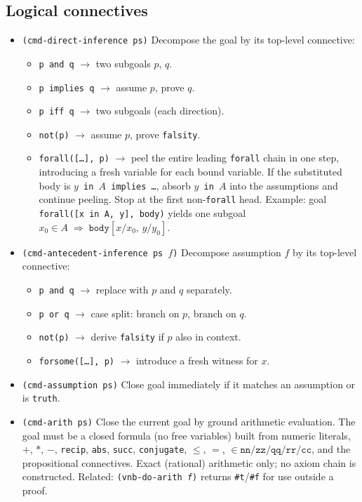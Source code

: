 \subsection{Logical connectives}

\begin{itemize}

\item \texttt{(cmd-direct-inference ps)}
  Decompose the goal by its top-level connective:
  \begin{itemize}
  \item \texttt{p and q} $\to$ two subgoals $p$, $q$.
  \item \texttt{p implies q} $\to$ assume $p$, prove $q$.
  \item \texttt{p iff q} $\to$ two subgoals (each direction).
  \item \texttt{not(p)} $\to$ assume $p$, prove \texttt{falsity}.
  \item \texttt{forall([\ldots], p)} $\to$ peel the entire leading
    \texttt{forall} chain in one step, introducing a fresh variable for
    each bound variable.  If the substituted body is
    \texttt{$y$ in $A$ implies \ldots}, absorb \texttt{$y$ in $A$} into
    the assumptions and continue peeling.  Stop at the first
    non-\texttt{forall} head.
    Example: goal \texttt{forall([x in A, y], body)} yields one subgoal
    $x_0 \in A \;\Longrightarrow\; \texttt{body}[x/x_0,\,y/y_0]$.
  \end{itemize}

\item \texttt{(cmd-antecedent-inference ps $f$)}
  Decompose assumption $f$ by its top-level connective:
  \begin{itemize}
  \item \texttt{p and q} $\to$ replace with $p$ and $q$ separately.
  \item \texttt{p or q} $\to$ case split: branch on $p$, branch on $q$.
  \item \texttt{not(p)} $\to$ derive \texttt{falsity} if $p$ also in context.
  \item \texttt{forsome([\ldots], p)} $\to$ introduce a fresh witness for $x$.
  \end{itemize}

\item \texttt{(cmd-assumption ps)}
  Close goal immediately if it matches an assumption or is \texttt{truth}.

\item \texttt{(cmd-arith ps)}
  Close the current goal by ground arithmetic evaluation.  The goal must
  be a closed formula (no free variables) built from numeric literals,
  $+$, $*$, $-$, \texttt{recip}, \texttt{abs}, \texttt{succ},
  \texttt{conjugate}, $\leq$, $=$,
  $\in \mathtt{nn}/\mathtt{zz}/\mathtt{qq}/\mathtt{rr}/\mathtt{cc}$,
  and the propositional connectives.  Exact (rational) arithmetic only;
  no axiom chain is constructed.
  Related: \texttt{(vnb-do-arith \textit{f})} returns \texttt{\#t}/\texttt{\#f}
  for use outside a proof.


\end{itemize}
